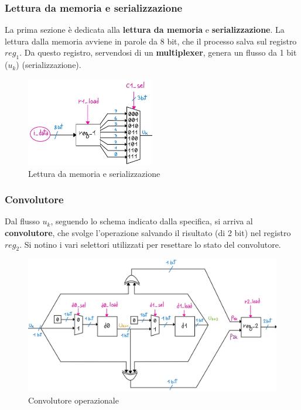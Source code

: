 \documentclass[12pt]{article} %
\begin{document}
			\subsubsection{Lettura da memoria e serializzazione}
				La prima sezione è dedicata alla \textbf{lettura da memoria} e \textbf{serializzazione}. 
				La lettura dalla memoria avviene in parole da 8 bit, che il processo salva  
				sul registro $reg_1$. Da questo registro, servendosi di un \textbf{multiplexer}, 
				genera un flusso  da 1 bit ($ u_k$) (serializzazione).
				\begin{figure}[h]
					\centering
					\includegraphics[width=0.5\textwidth]{Data_path_letturaMemoria.jpg}
					\caption{Lettura da memoria e serializzazione}
					\label{fig:Data_path_letturaMemoria}
				\end{figure}
			\subsubsection{Convolutore}
				Dal flusso $ u_k$, seguendo lo schema indicato dalla specifica, si arriva al \textbf{convolutore}, 
				che svolge l'operazione salvando il risultato (di 2 bit) nel registro $reg_2$. Si notino i vari
				selettori utilizzati per resettare lo stato del convolutore.
				\begin{figure}[h]
					\centering
					\includegraphics[width=\textwidth]{Data_path_convolutore.jpg}
					\caption{Convolutore operazionale}
					\label{fig:Data_path_convolutore}
				\end{figure}
\end{document}
